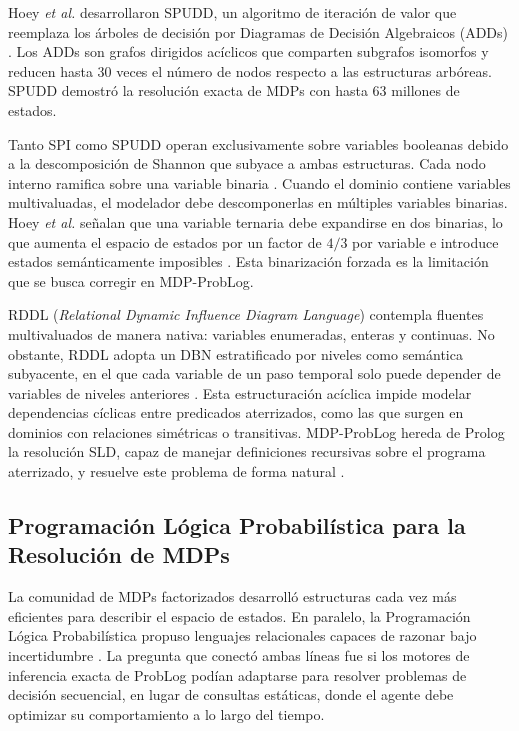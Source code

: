 Hoey \textit{et al.} desarrollaron SPUDD, un algoritmo de iteración de valor que reemplaza los árboles de decisión por Diagramas de Decisión Algebraicos (ADDs) \cite{hoey1999spudd}. Los ADDs son grafos dirigidos acíclicos que comparten subgrafos isomorfos y reducen hasta 30 veces el número de nodos respecto a las estructuras arbóreas. SPUDD demostró la resolución exacta de MDPs con hasta 63 millones de estados.

Tanto SPI como SPUDD operan exclusivamente sobre variables booleanas debido a la descomposición de Shannon que subyace a ambas estructuras. Cada nodo interno ramifica sobre una variable binaria \cite{hoey1999spudd}. Cuando el dominio contiene variables multivaluadas, el modelador debe descomponerlas en múltiples variables binarias. Hoey \textit{et al.} señalan que una variable ternaria debe expandirse en dos binarias, lo que aumenta el espacio de estados por un factor de $4/3$ por variable e introduce estados semánticamente imposibles \cite{hoey1999spudd}. Esta binarización forzada es la limitación que se busca corregir en MDP-ProbLog.

RDDL (\textit{Relational Dynamic Influence Diagram Language}) \cite{sanner2010rddl} contempla fluentes multivaluados de manera nativa: variables enumeradas, enteras y continuas. No obstante, RDDL adopta un DBN estratificado por niveles como semántica subyacente, en el que cada variable de un paso temporal solo puede depender de variables de niveles anteriores \cite{sanner2010rddl}. Esta estructuración acíclica impide modelar dependencias cíclicas entre predicados aterrizados, como las que surgen en dominios con relaciones simétricas o transitivas. MDP-ProbLog hereda de Prolog la resolución SLD, capaz de manejar definiciones recursivas sobre el programa aterrizado, y resuelve este problema de forma natural \cite{bueno2016mdp}.

\subsection{Programación Lógica Probabilística para la Resolución de MDPs}
\label{sec:ea-plp-mdps}

La comunidad de MDPs factorizados desarrolló estructuras cada vez más eficientes para describir el espacio de estados. En paralelo, la Programación Lógica Probabilística propuso lenguajes relacionales capaces de razonar bajo incertidumbre \cite{deraedt2015probabilistic}. La pregunta que conectó ambas líneas fue si los motores de inferencia exacta de ProbLog podían adaptarse para resolver problemas de decisión secuencial, en lugar de consultas estáticas, donde el agente debe optimizar su comportamiento a lo largo del tiempo.

